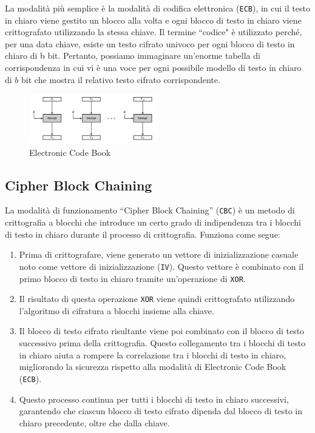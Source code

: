 La modalità più semplice è la modalità di codifica elettronica (\verb|ECB|), in cui
il testo in chiaro viene gestito un blocco alla volta e ogni blocco di testo
in chiaro viene crittografato utilizzando la stessa chiave. Il termine ``codice"
è utilizzato perché, per una data chiave, esiste un testo cifrato univoco per
ogni blocco di testo in chiaro di b bit. Pertanto, possiamo immaginare un'enorme
tabella di corrispondenza in cui vi è una voce per ogni possibile modello
di testo in chiaro di $b$ bit che mostra il relativo testo cifrato corrispondente.
\begin{figure}[H]
    \centering
    \includegraphics[width=0.5\textwidth]{img/electriccodeblock.png}
    \caption{Electronic Code Book}
\end{figure}

\subsection{Cipher Block Chaining}

La modalità di funzionamento ``Cipher Block Chaining'' (\verb|CBC|) è un metodo
di crittografia a blocchi che introduce un certo grado di indipendenza tra i
blocchi di testo in chiaro durante il processo di crittografia. Funziona come
segue:

\begin{enumerate}
    \item Prima di crittografare, viene generato un vettore di inizializzazione
    casuale noto come vettore di inizializzazione (\texttt{IV}). Questo vettore
    è combinato con il primo blocco di testo in chiaro tramite un'operazione di
    \texttt{XOR}.
    
    \item Il risultato di questa operazione \texttt{XOR} viene quindi
    crittografato utilizzando l'algoritmo di cifratura a blocchi insieme
    alla chiave.
    
    \item Il blocco di testo cifrato risultante viene poi combinato con il
    blocco di testo successivo prima della crittografia. Questo collegamento
    tra i blocchi di testo in chiaro aiuta a rompere la correlazione tra i
    blocchi di testo in chiaro, migliorando la sicurezza rispetto alla modalità
    di Electronic Code Book (\texttt{ECB}).
    
    \item Questo processo continua per tutti i blocchi di testo in chiaro
    successivi, garantendo che ciascun blocco di testo cifrato dipenda dal
    blocco di testo in chiaro precedente, oltre che dalla chiave.
\end{enumerate}


